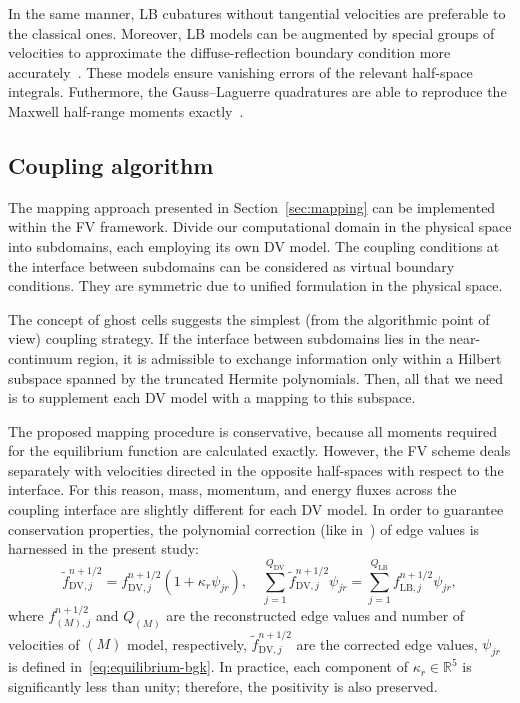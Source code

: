 \documentclass{elsarticle} %
\newcommand{\LB}{\mathrm{LB}\!}
\newcommand{\DV}{\mathrm{DV}\!}
\begin{document}
In the same manner, LB cubatures without tangential velocities are preferable to the classical ones.
Moreover, LB models can be augmented by special groups of velocities to approximate
the diffuse-reflection boundary condition more accurately~\cite{Feuchter2016}.
These models ensure vanishing errors of the relevant half-space integrals.
Futhermore, the Gauss--Laguerre quadratures are able to reproduce the Maxwell half-range moments
exactly~\cite{Ambrus2014, Ambrus2016}.

\subsection{Coupling algorithm}\label{sec:numerics:coupling}

The mapping approach presented in Section~\ref{sec:mapping} can be implemented within the FV framework.
Divide our computational domain in the physical space into subdomains, each employing its own DV model.
The coupling conditions at the interface between subdomains can be considered as virtual boundary conditions.
They are symmetric due to unified formulation in the physical space.

The concept of ghost cells suggests the simplest (from the algorithmic point of view) coupling strategy.
If the interface between subdomains lies in the near-continuum region,
it is admissible to exchange information only within a Hilbert subspace
spanned by the truncated Hermite polynomials.
Then, all that we need is to supplement each DV model with a mapping to this subspace.

The proposed mapping procedure is conservative,
because all moments required for the equilibrium function are calculated exactly.
However, the FV scheme deals separately with velocities
directed in the opposite half-spaces with respect to the interface.
For this reason, mass, momentum, and energy fluxes across the coupling interface
are slightly different for each DV model.
In order to guarantee conservation properties, the polynomial correction (like in~\cite{Aristov1980})
of edge values is harnessed in the present study:
\begin{equation}\label{eq:poly_correction}
    \tilde{f}^{n+1/2}_{\DV,j} = f^{n+1/2}_{\DV,j}(1 + \kappa_r\psi_{jr}), \quad
    \sum_{j=1}^{Q_{\DV}} \tilde{f}^{n+1/2}_{\DV,j}\psi_{jr} =
    \sum_{j=1}^{Q_{\LB}} f^{n+1/2}_{\LB,j}\psi_{jr},
\end{equation}
where \({f}^{n+1/2}_{(M),j}\) and \(Q_{(M)}\) are the reconstructed edge values
and number of velocities of \((M)\) model, respectively,
\(\tilde{f}^{n+1/2}_{\DV,j}\) are the corrected edge values,
\(\psi_{jr}\) is defined in~\eqref{eq:equilibrium-bgk}.
In practice, each component of \(\kappa_r\in\mathbb{R}^5\) is significantly less than unity;
therefore, the positivity is also preserved.
\end{document}
